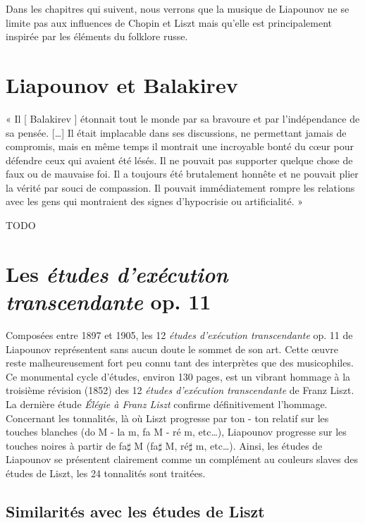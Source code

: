Dans les chapitres qui suivent, nous verrons que la musique de Liapounov ne se limite pas aux influences de Chopin et Liszt mais qu'elle est principalement inspirée par les éléments du folklore russe.

\section{Liapounov et Balakirev}

« Il [ Balakirev ] étonnait tout le monde par sa bravoure et par l'indépendance de sa pensée. [\dots] Il était implacable dans ses discussions, ne permettant jamais de compromis, mais en même temps il montrait une incroyable bonté du cœur pour défendre ceux qui avaient été lésés. Il ne pouvait pas supporter quelque chose de faux ou de mauvaise foi. Il a toujours été brutalement honnête et ne pouvait plier la vérité par souci de compassion. Il pouvait immédiatement rompre les relations avec les gens qui montraient des signes d'hypocrisie ou artificialité. »



TODO

\newpage
\newpage

\section{Les \emph{études d'exécution transcendante} op. 11}

Composées entre 1897 et 1905, les 12 \emph{études d'exécution transcendante} op. 11 de Liapounov représentent sans aucun doute le sommet de son art. Cette œuvre reste malheureusement fort peu connu tant des interprètes que des musicophiles. Ce monumental cycle d'études, environ 130 pages, est un vibrant hommage à la troisième révision (1852) des 12 \emph{études d'exécution transcendante} de Franz Liszt. La dernière étude \emph{Élégie à Franz Liszt} confirme définitivement l'hommage. Concernant les tonnalités, là où Liszt progresse par ton - ton relatif sur les touches blanches (do M - la m, fa M - ré m, etc\ldots), Liapounov progresse sur les touches noires à partir de fa$\sharp$ M (fa$\sharp$ M, ré$\sharp$ m, etc\ldots). Ainsi, les études de Liapounov se présentent clairement comme un complément au couleurs slaves des études de Liszt, les 24 tonnalités sont traitées.

\subsection{Similarités avec les études de Liszt}


